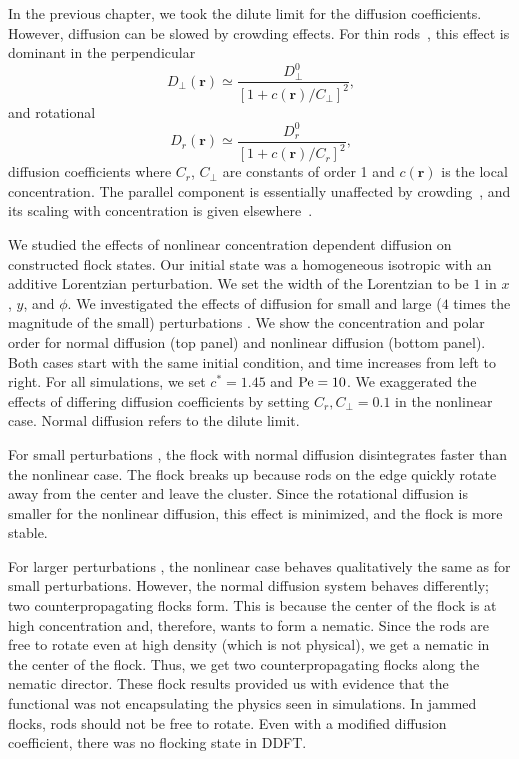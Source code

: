 In the previous chapter, we took the dilute limit for the diffusion
coefficients. However, diffusion can be slowed by crowding effects. For thin
rods~\cite{doi_theory_88,frenkel_molecular_81, frenkel_molecular_83,
  liverpool_instabilities_03}, this effect is dominant in the perpendicular 
%
\begin{equation}~\label{eqn:dnl_perp}
  D_{\perp}(\bm{r}) \simeq \frac{D^0_{\perp} } {{[ 1 + c(\bm{r})/C_{\perp} ]}^2 } ,
\end{equation}
%
and rotational
%
\begin{equation}~\label{eqn:dnl_r}
  D_{r}(\bm{r}) \simeq \frac{D^0_r}{{[ 1 + c(\bm{r})/C_{r} ]}^2},
\end{equation}
%
diffusion coefficients where $C_{r}$, $C_{\perp}$ are constants of order 1 and
$c(\bm{r})$ is the local concentration. The parallel component is essentially
unaffected by crowding~\cite{liverpool_instabilities_03}, and its scaling with
concentration is given elsewhere~\cite{frenkel_molecular_81,
  frenkel_molecular_83}. 

We studied the effects of nonlinear concentration dependent diffusion on
constructed flock states. Our initial state was a homogeneous
isotropic with an additive Lorentzian perturbation. We set the width of the
Lorentzian to be $1$ in $x$, $y$, and $\phi$.  We investigated the effects of
diffusion for small  and large ($4$ times the
magnitude of the small) perturbations . We show the concentration and polar order for normal diffusion (top panel) and
nonlinear diffusion (bottom panel). Both cases start with the same initial
condition, and time increases from left to right. For all simulations, we set
$c^*=1.45$ and $\text{Pe} = 10$. We exaggerated the effects of differing diffusion
coefficients by setting $C_{r}, C_{\perp} = 0.1$ in the nonlinear case. Normal
diffusion refers to the dilute limit.

For small perturbations , the flock with normal
diffusion disintegrates faster than the nonlinear case. The flock breaks up
because rods on the edge quickly rotate away from the center and leave the
cluster. Since the rotational diffusion is smaller for the nonlinear diffusion,
this effect is minimized, and the flock is more stable. 

For larger perturbations , the nonlinear case behaves
qualitatively the same as for small perturbations. However, the normal
diffusion system behaves differently; two counterpropagating
flocks form. This is because the center of the flock is at high
concentration and, therefore, wants to form a nematic. Since the rods are free
to rotate even at high density (which is not physical), we get a nematic in the
center of the flock. Thus, we get two counterpropagating flocks along the
nematic director. These flock results provided us with evidence that the
functional was not encapsulating the physics seen in simulations. In jammed
flocks, rods should not be free to rotate. Even with a modified diffusion
coefficient, there was no flocking state in DDFT\@.

